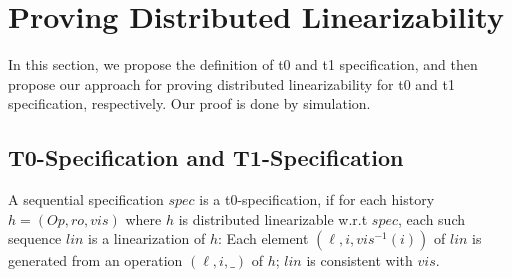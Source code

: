 
\section{Proving Distributed Linearizability}
\label{sec:proving distributed linearizability}

In this section, we propose the definition of t0 and t1 specification, and then propose our approach for proving distributed linearizability for t0 and t1 specification, respectively. Our proof is done by simulation.



\subsection{T0-Specification and T1-Specification}
\label{subsec:t0 specification and t1 specification}



\begin{definition}[t0-specification]
\label{definition:t0-specification}
A sequential specification $\mathit{spec}$ is a t0-specification, if for each history $h=(\mathit{Op},\mathit{ro},\mathit{vis})$ where $h$ is distributed linearizable w.r.t $\mathit{spec}$, each such sequence $\mathit{lin}$ is a linearization of $h$: Each element $(\ell,i,\mathit{vis}^{-1}(i))$ of $\mathit{lin}$ is generated from an operation $(\ell,i,\_)$ of $h$; $\mathit{lin}$ is consistent with $\mathit{vis}$. 


\end{definition}

